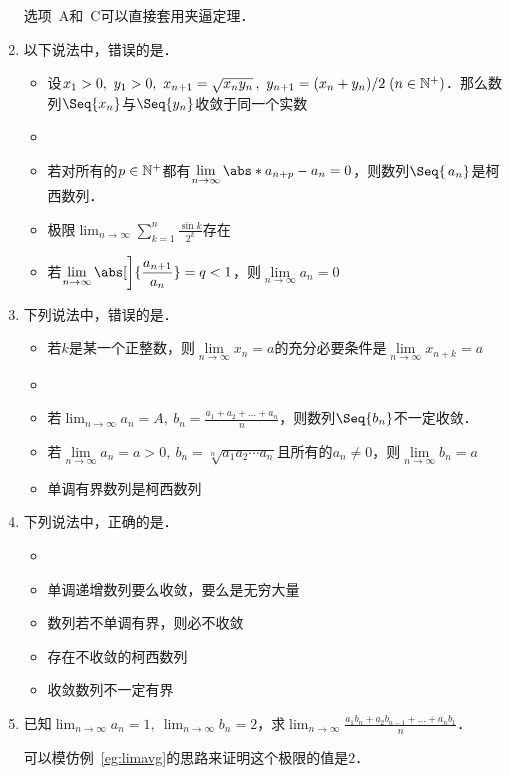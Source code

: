 \begin{enumerate}
    选项~A和~C可以直接套用夹逼定理．
  \fi

\item 以下说法中，错误的是\uline{\makebox[10em]{}}．
  \begin{itemize}
    \renewcommand{\labelitemi}{\faCircleThin}
    \addtolength{\itemsep}{1ex}
  \item 设\(x_1 > 0,\ y_1 > 0,\ x_{n+1} = \sqrt{x_n y_n}\,,\ y_{n+1} = (x_n+y_n)/2 \; (n \in \mathbb{N}^+)\)．那么数列\(\Seq{x_n}\)与\(\Seq{y_n}\)收敛于同一个实数
    \ifshowsol
    \item[\faCircle]
    \else
    \item
    \fi
    若对所有的\(p \in \mathbb{N}^+\)都有\(\lim\limits_{n\to\infty} \abs*{a_{n+p}-a_n} = 0\)，则数列\(\Seq{\,a_n}\)是柯西数列． %
  \item 极限\(\displaystyle \lim_{n\to\infty} \sum_{k=1}^n \frac{\sin k}{2^k}\)存在
  \item 若\(\displaystyle \lim_{n\to\infty} \abs[\bigg]{\frac{a_{n+1}}{a_n}} = q < 1\)，则\(\lim\limits_{n\to\infty} a_n = 0\)
  \end{itemize}

\item 下列说法中，错误的是\uline{\makebox[10em]{}}．
  \begin{itemize}
    \renewcommand{\labelitemi}{\faCircleThin}
    \addtolength{\itemsep}{.67ex}
  \item 若\(k\)是某一个正整数，则\(\lim\limits_{n\to\infty} x_n = a\)的充分必要条件是\(\lim\limits_{n\to\infty} x_{n+k} = a\)
    \ifshowsol
    \item[\faCircle]
    \else
    \item
    \fi
    若\(\displaystyle \lim_{n\to\infty} a_n = A,\ b_n = \frac{a_1 + a_2 + \dots + a_n}{n}\)，则数列\(\Seq{b_n}\)不一定收敛．
  \item 若\(\lim\limits_{n\to\infty} a_n = a > 0,\ b_n = \sqrt[n]{a_1 a_2 \dotsm a_n}\)且所有的\(a_n \ne 0\)，则\(\lim\limits_{n\to\infty} b_n = a\)
  \item 单调有界数列是柯西数列
  \end{itemize}

\item 下列说法中，正确的是\uline{\makebox[10em]{}}．
  \begin{itemize}
    \renewcommand{\labelitemi}{\faCircleThin}
    \ifshowsol
    \item[\faCircle]
    \else
    \item
    \fi
    单调递增数列要么收敛，要么是无穷大量
  \item 数列若不单调有界，则必不收敛
  \item 存在不收敛的柯西数列
  \item 收敛数列不一定有界
  \end{itemize}

\item 已知\(\displaystyle \lim_{n\to\infty} a_n = 1,\ \lim_{n\to\infty} b_n = 2\)，求\(\displaystyle \lim_{n\to\infty} \frac{a_1 b_n + a_2 b_{n-1} + \dots + a_n b_1}{n}\)．

  \ifshowsol
    可以模仿例~\ref{eg:limavg}的思路来证明这个极限的值是\(2\)．
  \fi
\end{enumerate}
\fi

